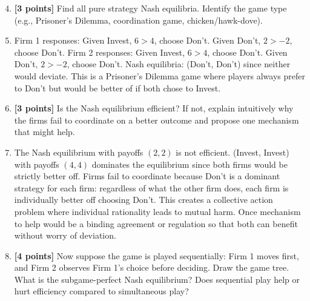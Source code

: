 \documentclass[11pt]{article}
\begin{document}
\begin{enumerate}[label=(\alph*)]
    \setcounter{enumi}{3}
    \item \textbf{[3 points]} Find all pure strategy Nash equilibria. Identify the game type (e.g., Prisoner's Dilemma, coordination game, chicken/hawk-dove).
    \item[] Firm 1 responses: Given Invest, $6>4$, choose Don't. Given Don't, $2>-2$, choose Don't. Firm 2 responses: Given Invest, $6>4$, choose Don't. Given Don't, $2>-2$, choose Don't. Nash equilibria: (Don't, Don't) since neither would deviate. This is a Prisoner's Dilemma game where players always prefer to Don't but would be better of if both chose to Invest.
    
    \item \textbf{[3 points]} Is the Nash equilibrium efficient? If not, explain intuitively why the firms fail to coordinate on a better outcome and propose one mechanism that might help.
    \item[] The Nash equilibrium with payoffs $(2,2)$ is not efficient. (Invest, Invest) with payoffs $(4,4)$ dominates the equilibrium since both firms would be strictly better off. Firms fail to coordinate because Don't is a dominant strategy for each firm: regardless of what the other firm does, each firm is individually better off choosing Don't. This creates a collective action problem where individual rationality leads to mutual harm. Once mechanism to help would be a binding agreement or regulation so that both can benefit without worry of deviation.

    
    \item \textbf{[4 points]} Now suppose the game is played sequentially: Firm 1 moves first, and Firm 2 observes Firm 1's choice before deciding. Draw the game tree. What is the subgame-perfect Nash equilibrium? Does sequential play help or hurt efficiency compared to simultaneous play?
    
\begin{center}
\end{center}


\end{enumerate}
\end{document}
